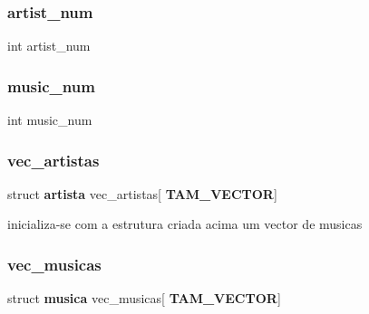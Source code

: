 \subsubsection{artist\_num}
{\footnotesize\ttfamily int artist\+\_\+num}

\mbox{\label{project_8h_a2fc88755839757d7176cb71c37064b39}} 
\subsubsection{music\_num}
{\footnotesize\ttfamily int music\+\_\+num}

\mbox{\label{project_8h_ad7366ec3b30d40056803ba82b07bedbb}} 
\subsubsection{vec\_artistas}
{\footnotesize\ttfamily struct \textbf{ artista} vec\+\_\+artistas[\textbf{ T\+A\+M\+\_\+\+V\+E\+C\+T\+OR}]}



inicializa-\/se com a estrutura criada acima um vector de musicas 

\mbox{\label{project_8h_aecc89fa6b382a59cfae03f0d18156808}} 
\subsubsection{vec\_musicas}
{\footnotesize\ttfamily struct \textbf{ musica} vec\+\_\+musicas[\textbf{ T\+A\+M\+\_\+\+V\+E\+C\+T\+OR}]}


